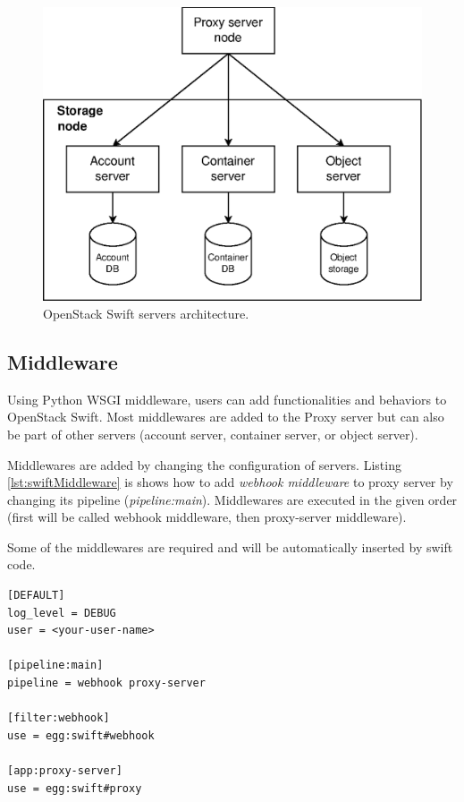 \documentclass{ExcelAtFIT}
\begin{document}
\begin{figure}[t]
		\centering
		\includegraphics[width=0.90\linewidth]{images/swift-servers.eps}
		\caption{OpenStack Swift servers architecture.}
		\label{fig:swiftServers}
\end{figure}


\subsection{Middleware}\label{sbs:swiftMiddleware}
Using Python WSGI middleware, users can add functionalities and behaviors to OpenStack Swift. Most middlewares are added to the Proxy server but can also be part of other servers (account server, container server, or object server).

Middlewares are added by changing the configuration of servers. Listing \ref{lst:swiftMiddleware} is shows how to add \textit{webhook middleware} to proxy server by changing its pipeline (\textit{pipeline:main}). Middlewares are executed in the given order (first will be called webhook middleware, then proxy-server middleware).

Some of the middlewares are required and will be automatically inserted by swift code\cite{swiftMiddleware}.

\lstset{
		caption=Example of proxy server configuration (proxy-server.conf).,
		label=lst:swiftMiddleware
}
\begin{lstlisting}
[DEFAULT]
log_level = DEBUG
user = <your-user-name>

[pipeline:main]
pipeline = webhook proxy-server

[filter:webhook]
use = egg:swift#webhook

[app:proxy-server]
use = egg:swift#proxy
\end{lstlisting}
\end{document}
